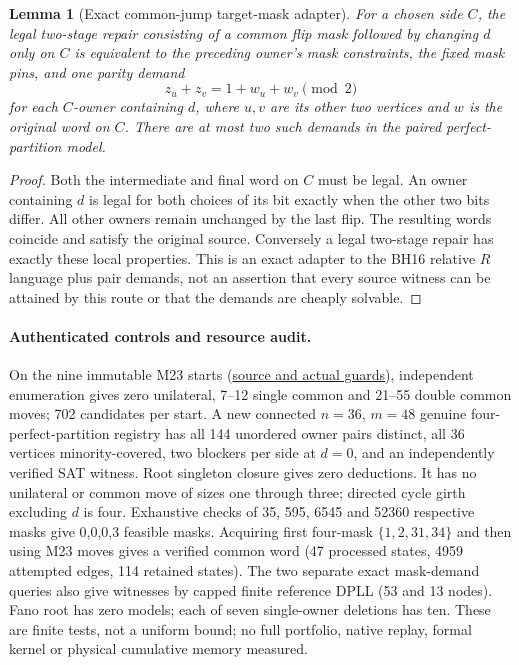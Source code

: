 \documentclass[11pt]{article}
\newtheorem{lemma}[theorem]{Lemma}
\begin{document}
\begin{lemma}[Exact common-jump target-mask adapter]\label{lem:dr17-mask}
For a chosen side $C$, the legal two-stage repair consisting of a common flip mask followed by changing $d$ only on $C$ is equivalent to the preceding owner's mask constraints, the fixed mask pins, and one parity demand
\[
 z_u+z_v=1+w_u+w_v\pmod 2
\]
for each $C$-owner containing $d$, where $u,v$ are its other two vertices and $w$ is the original word on $C$. There are at most two such demands in the paired perfect-partition model.
\end{lemma}
\begin{proof}
Both the intermediate and final word on $C$ must be legal. An owner containing $d$ is legal for both choices of its bit exactly when the other two bits differ. All other owners remain unchanged by the last flip. The resulting words coincide and satisfy the original source. Conversely a legal two-stage repair has exactly these local properties. This is an exact adapter to the BH16 relative $R$ language plus pair demands, not an assertion that every source witness can be attained by this route or that the demands are cheaply solvable.
\end{proof}
\paragraph{Authenticated controls and resource audit.}
On the nine immutable M23 starts (\href{https://github.com/j15marti/pnp/commit/a412bf23a0b63f03c886b7bf5bd50217b5502db2}{source and actual guards}), independent enumeration gives zero unilateral, 7--12 single common and 21--55 double common moves; 702 candidates per start. A new connected $n=36$, $m=48$ genuine four-perfect-partition registry has all 144 unordered owner pairs distinct, all 36 vertices minority-covered, two blockers per side at $d=0$, and an independently verified SAT witness. Root singleton closure gives zero deductions. It has no unilateral or common move of sizes one through three; directed cycle girth excluding $d$ is four. Exhaustive checks of 35, 595, 6545 and 52360 respective masks give 0,0,0,3 feasible masks. Acquiring first four-mask $\{1,2,31,34\}$ and then using M23 moves gives a verified common word (47 processed states, 4959 attempted edges, 114 retained states). The two separate exact mask-demand queries also give witnesses by capped finite reference DPLL (53 and 13 nodes). Fano root has zero models; each of seven single-owner deletions has ten. These are finite tests, not a uniform bound; no full portfolio, native replay, formal kernel or physical cumulative memory measured.
\end{document}
